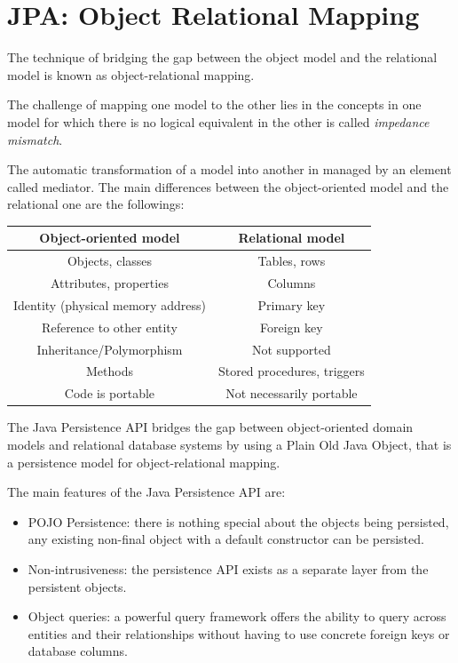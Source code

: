 \section{JPA: Object Relational Mapping}

    The technique of bridging the gap between the object model and the relational model is known as object-relational mapping. 
    \begin{definition}
        The challenge of mapping one model to the other lies in the concepts in one model for which there is no logical equivalent in the other is called 
        \emph{impedance mismatch}.
    \end{definition}
    The automatic transformation of a model into another in managed by an element called mediator. The main differences between the object-oriented model and the 
    relational one are the followings: 
    \begin{table}[H]
        \centering
        \begin{tabular}{cc}
        \hline
        \textbf{Object-oriented model}     & \textbf{Relational model}   \\ \hline
        Objects, classes                   & Tables, rows                \\
        Attributes, properties             & Columns                     \\
        Identity (physical memory address) & Primary key                 \\
        Reference to other entity          & Foreign key                 \\
        Inheritance/Polymorphism           & Not supported               \\
        Methods                            & Stored procedures, triggers \\
        Code is portable                   & Not necessarily portable    \\ \hline
        \end{tabular}
    \end{table}
    The Java Persistence API bridges the gap between object-oriented domain models and relational database systems by using a Plain Old Java Object, that is a 
    persistence model for object-relational mapping. 

    The main features of the Java Persistence API are: 
    \begin{itemize}
        \item POJO Persistence: there is nothing special about the objects being persisted, any existing non-final object with a default constructor can be persisted.
        \item Non-intrusiveness: the persistence API exists as a separate layer from the persistent objects.
        \item Object queries: a powerful query framework offers the ability to query across entities and their relationships without having to use concrete foreign keys or database columns.
    \end{itemize}

